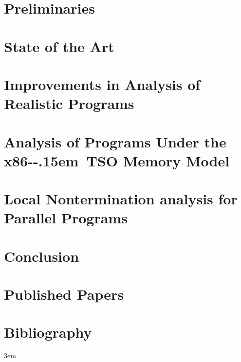 \documentclass[11pt,twoside,a4paper]{book}
\newcommand{\xtso}{\mbox{x86-\kern-.15em TSO}\xspace}
\theoremstyle{mydefstyle}
\begin{document}
\chapter{Preliminaries}\label{chap:preliminaries}


\chapter{State of the Art}\label{chap:stateoftheart}


\chapter{Improvements in Analysis of Realistic Programs}\label{chap:lang}


\chapter{Analysis of Programs Under the \xtso Memory Model}\label{chap:mm}


\chapter{Local Nontermination analysis for Parallel Programs}\label{chap:lnterm}


\chapter{Conclusion}\label{chap:conclusion}

\appendix

\chapter{Published Papers}\label{chap:published}


\chapter{Bibliography}

{
    \emergencystretch 3em %
    \printbibliography[heading=none]
}
\end{document}
